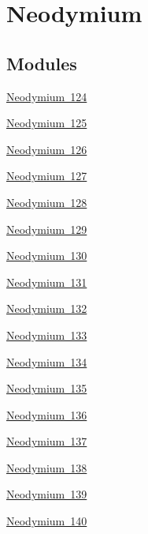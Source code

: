 \hypertarget{group___isotope_const-_neodymium}{}\section{Neodymium}
\label{group___isotope_const-_neodymium}
\subsection*{Modules}
\begin{DoxyCompactItemize}
\item 
\mbox{\hyperlink{group___isotope_const-_neodymium-_nd124}{Neodymium 124}}
\item 
\mbox{\hyperlink{group___isotope_const-_neodymium-_nd125}{Neodymium 125}}
\item 
\mbox{\hyperlink{group___isotope_const-_neodymium-_nd126}{Neodymium 126}}
\item 
\mbox{\hyperlink{group___isotope_const-_neodymium-_nd127}{Neodymium 127}}
\item 
\mbox{\hyperlink{group___isotope_const-_neodymium-_nd128}{Neodymium 128}}
\item 
\mbox{\hyperlink{group___isotope_const-_neodymium-_nd129}{Neodymium 129}}
\item 
\mbox{\hyperlink{group___isotope_const-_neodymium-_nd130}{Neodymium 130}}
\item 
\mbox{\hyperlink{group___isotope_const-_neodymium-_nd131}{Neodymium 131}}
\item 
\mbox{\hyperlink{group___isotope_const-_neodymium-_nd132}{Neodymium 132}}
\item 
\mbox{\hyperlink{group___isotope_const-_neodymium-_nd133}{Neodymium 133}}
\item 
\mbox{\hyperlink{group___isotope_const-_neodymium-_nd134}{Neodymium 134}}
\item 
\mbox{\hyperlink{group___isotope_const-_neodymium-_nd135}{Neodymium 135}}
\item 
\mbox{\hyperlink{group___isotope_const-_neodymium-_nd136}{Neodymium 136}}
\item 
\mbox{\hyperlink{group___isotope_const-_neodymium-_nd137}{Neodymium 137}}
\item 
\mbox{\hyperlink{group___isotope_const-_neodymium-_nd138}{Neodymium 138}}
\item 
\mbox{\hyperlink{group___isotope_const-_neodymium-_nd139}{Neodymium 139}}
\item 
\mbox{\hyperlink{group___isotope_const-_neodymium-_nd140}{Neodymium 140}}

\end{DoxyCompactItemize}
